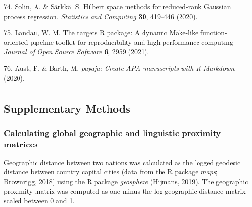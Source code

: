 \documentclass[english,man,floatsintext]{apa6}
\begin{document}
\leavevmode\hypertarget{ref-Solin2020}{}%
74. Solin, A. \& Särkkä, S. Hilbert space methods for reduced-rank Gaussian process regression. \emph{Statistics and Computing} \textbf{30}, 419--446 (2020).

\leavevmode\hypertarget{ref-Landau2021}{}%
75. Landau, W. M. The targets R package: A dynamic Make-like function-oriented pipeline toolkit for reproducibility and high-performance computing. \emph{Journal of Open Source Software} \textbf{6}, 2959 (2021).

\leavevmode\hypertarget{ref-Aust2020}{}%
76. Aust, F. \& Barth, M. \emph{papaja: Create APA manuscripts with R Markdown}. (2020).

\endgroup

\newpage

\hypertarget{appendix-appendix}{%
\appendix}


\renewcommand{\appendixname}{\bf{Supplementary Material}}
\renewcommand{\figurename}{Supplementary Figure}
\renewcommand{\tablename}{Supplementary Table}
\renewcommand{\thefigure}{S\arabic{figure}} \setcounter{figure}{0}
\renewcommand{\thetable}{S\arabic{table}} \setcounter{table}{0}
\renewcommand{\theequation}{S\arabic{table}} \setcounter{equation}{0}

\hypertarget{section}{%
\section{}\label{section}}

\hypertarget{supplementary-methods}{%
\subsection{Supplementary Methods}\label{supplementary-methods}}

\hypertarget{calculating-global-geographic-and-linguistic-proximity-matrices}{%
\subsubsection{Calculating global geographic and linguistic proximity matrices}\label{calculating-global-geographic-and-linguistic-proximity-matrices}}

Geographic distance between two nations was calculated as the logged geodesic distance between country capital cities (data from the R package \emph{maps}; Brownrigg, 2018) using the R package \emph{geosphere} (Hijmans, 2019). The geographic proximity matrix was computed as one minus the log geographic distance matrix scaled between 0 and 1.
\end{document}
